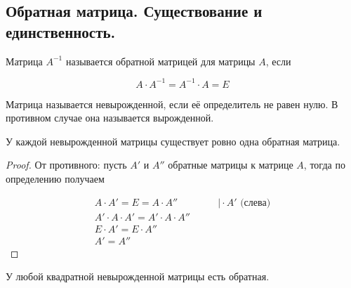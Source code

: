 \subsection{%
  Обратная матрица. Существование и единственность.%
}

\begin{definition}
  Матрица \(A^{-1}\) называется обратной матрицей для матрицы \(A\), если
  
  \begin{equation*}
    A \cdot A^{-1} = A^{-1} \cdot A = E
  \end{equation*}
\end{definition}

\begin{definition}
   Матрица называется невырожденной, если её определитель не равен нулю. В
  противном случае она называется вырожденной.
\end{definition}

\begin{theorem}
  У каждой невырожденной матрицы существует ровно одна обратная матрица.
\end{theorem}

\begin{proof}
  От противного: пусть \(A'\) и \(A''\) обратные матрицы к матрице \(A\), тогда
  по определению получаем
  
  \begin{equation*}
    \begin{aligned}
      A \cdot A' = E = A \cdot A'' & \qquad \Big\vert \cdot A' \text{ (слева)}
    \\
      A' \cdot A \cdot A' = A' \cdot A \cdot A'' &
    \\
      E \cdot A' = E \cdot A'' &
    \\
      A' = A'' &
    \end{aligned}
  \end{equation*}
\end{proof}

\begin{theorem}
  У любой квадратной невырожденной матрицы есть обратная.
\end{theorem}

